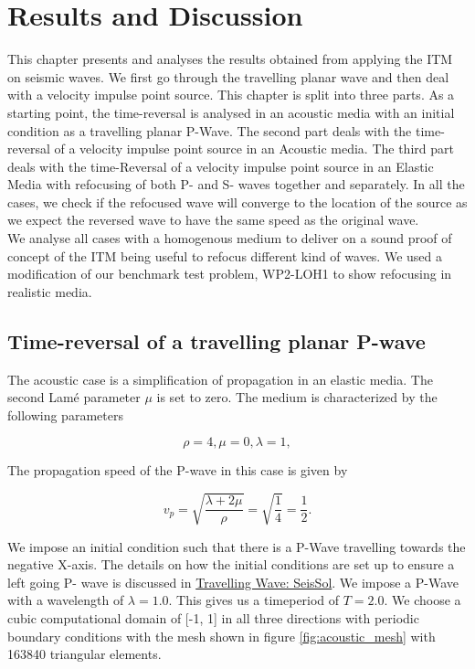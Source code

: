 \chapter{Results and Discussion}

This chapter presents and analyses the results obtained from applying the \ac{ITM} on seismic waves. We first go through the travelling planar wave and then deal with
a velocity impulse point source. This chapter is split into three parts. As a starting point, the time-reversal is analysed in an acoustic media with an initial condition
as a travelling planar P-Wave. The second part deals with the time-reversal of a velocity impulse point source in an Acoustic media. The third part deals with the time-Reversal
of a velocity impulse point source in an Elastic Media with refocusing of both P- and S- waves together and separately. In all the cases, we check if the refocused
wave will converge to the location of the source as we expect the reversed wave to have the same speed as the original wave. \\

We analyse all cases with a homogenous medium to deliver on a sound proof of concept of the \ac{ITM} being useful to refocus different kind of waves. We used a modification
of our benchmark test problem, WP2-LOH1 to show refocusing in realistic media.

\section{Time-reversal of a travelling planar P-wave}
The acoustic case is a simplification of propagation in an elastic media. The second Lam\'{e} parameter $\mu$ is set to zero. The medium is characterized by the following parameters

\begin{equation}
    \rho = 4, \mu = 0, \lambda = 1 ,
\end{equation}

The propagation speed of the P-wave in this case is given by

\begin{equation}
    v_p = \sqrt{\frac{\lambda + 2 \mu}{\rho}} = \sqrt{\frac{1}{4}} = \frac{1}{2} .
\end{equation}

We impose an initial condition such that there is a P-Wave travelling towards the negative X-axis. The details on how the initial conditions are set up to ensure a left going P- wave is discussed in
\href{https://seissol.readthedocs.io/en/latest/initial-condition.html#travelling-wave}{Travelling Wave: SeisSol}. We impose a P-Wave with a wavelength of 
$\lambda = 1.0$. This gives us a timeperiod of $T=2.0$. We choose a cubic computational domain of [-1, 1] in all three directions with periodic boundary conditions with the mesh shown in figure \ref{fig:acoustic_mesh} with
163840 triangular elements. 

